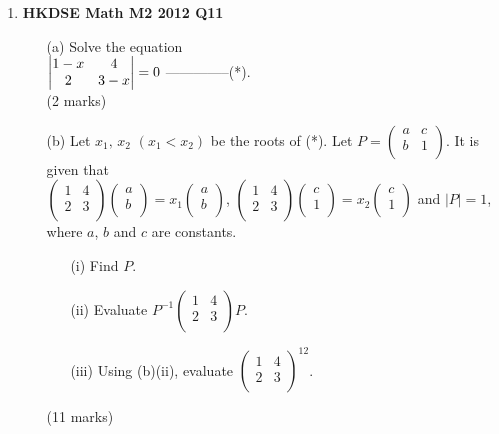 \documentclass[12pt]{article}
\begin{document}
\begin{enumerate}
	\item \textbf{HKDSE Math M2 2012 Q11}
	\begin{enumerate}
		\item [(a)]Solve the equation \\$\begin{vmatrix}
			1-x & 4  \\ 
			2 & 3-x  \notag
		\end{vmatrix} = 0 $ --------------(*). \\(2 marks)
		\item [(b)]Let $x_1 ,\, x_2  $ $(x_1<x_2)$ be the roots of (*). Let $P = \begin{pmatrix}
			a&c\\b&1\\
		\end{pmatrix}$. It is given that \\
		$\begin{pmatrix}1&4\\2&3\\\end{pmatrix}\begin{pmatrix}a\\b\\\end{pmatrix} = x_1 \begin{pmatrix}a\\b\\\end{pmatrix}$, $\begin{pmatrix}1&4\\2&3\\\end{pmatrix}\begin{pmatrix}c\\1\\\end{pmatrix} = x_2 \begin{pmatrix}c\\1\\\end{pmatrix}$ and $|P| =1$,\\
		where $a$, $b$ and $c$ are constants.
		\begin{enumerate}
			\item [(i)]Find $P$.
			\item [(ii)]Evaluate $P^{-1}\begin{pmatrix}1&4\\2&3\\\end{pmatrix}P$.
			\item [(iii)]Using (b)(ii), evaluate $\begin{pmatrix}1&4\\2&3\\\end{pmatrix}^{12}$.
		\end{enumerate}
		(11 marks)
	\end{enumerate}



\end{enumerate}
\end{document}
